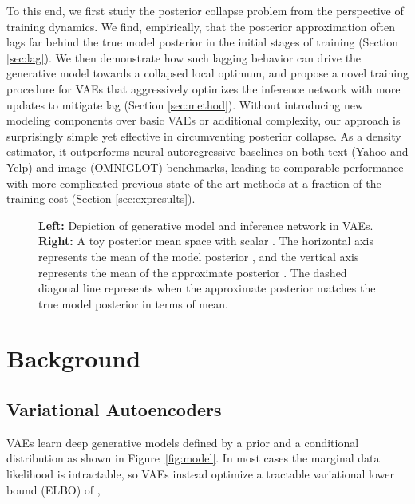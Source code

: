 \documentclass{article} \usepackage{iclr2019_conference,times}
\begin{document}
To this end, we first study the posterior collapse problem from the perspective of training dynamics. We find, empirically, that the posterior approximation often lags far behind the true model posterior in the initial stages of training (Section \ref{sec:lag}).
We then demonstrate how such lagging behavior can drive the generative model towards a collapsed local optimum, and propose a novel training procedure for VAEs that aggressively optimizes the inference network with more updates to mitigate lag (Section \ref{sec:method}).
Without introducing new modeling components over basic VAEs or additional complexity, our approach is surprisingly simple yet effective in circumventing posterior collapse.
As a density estimator, it outperforms neural autoregressive baselines on both text (Yahoo and Yelp) and image (OMNIGLOT) benchmarks, leading to comparable performance with more complicated previous state-of-the-art methods at a fraction of the training cost (Section \ref{sec:expresults}).

\begin{figure}[!t]
\centering
    \hspace{2cm}
\caption{\textbf{Left:} Depiction of generative model  and inference network  in VAEs. \textbf{Right:} A toy posterior mean space  with scalar . The horizontal axis represents the mean of the model posterior , and the vertical axis represents the mean of the approximate posterior . The dashed diagonal line represents when the approximate posterior matches the true model posterior in terms of mean.}
\vspace{-10pt}
\end{figure}

\section{Background}
\subsection{Variational Autoencoders}
\label{sec:vae-bg}
VAEs learn deep generative models defined by a prior  and a conditional distribution  as shown in Figure~\ref{fig:model}. In most cases the marginal data likelihood is intractable,
so VAEs instead optimize a tractable variational lower bound (ELBO) of ,
\end{document}
